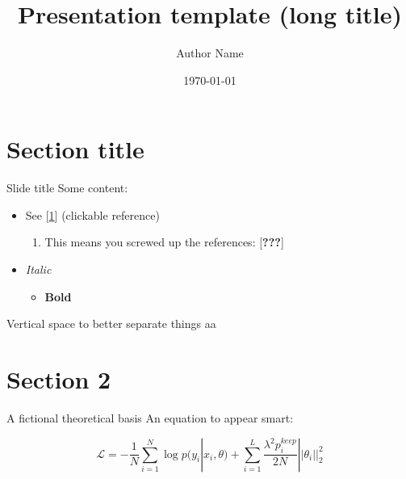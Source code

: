 \documentclass[ignorenonframetext,]{beamer}
\title[template (short title)]{Presentation template (long title)}
\author{Author Name}
\institute[INST1, INST2]{Institute 1 \and Institute 2 \newline on two lines}
\date{\today}
\providecommand{\tightlist}{%
  \setlength{\itemsep}{0pt}\setlength{\parskip}{0pt}}
\begin{document}
\frame{\titlepage}

\hypertarget{section-title}{%
\section{Section title}\label{section-title}}

\begin{frame}{Slide title}
\protect\hypertarget{slide-title}{}
Some content:

\begin{itemize}
\tightlist
\item
  See {[}\protect\hyperlink{ref-gptNIPS}{1}{]} (clickable reference)

  \begin{enumerate}
  \tightlist
  \item
    This means you screwed up the references: {[}{\textbf{???}}{]}
  \end{enumerate}
\item
  \emph{Italic}

  \begin{itemize}
  \tightlist
  \item
    \textbf{Bold}
  \end{itemize}
\end{itemize}

Vertical space to better separate things aa
\end{frame}

\hypertarget{section-2}{%
\section{Section 2}\label{section-2}}

\begin{frame}{A fictional theoretical basis}
\protect\hypertarget{a-fictional-theoretical-basis}{}
An equation to appear smart:

\begin{equation}
\mathcal{L}=-\frac 1 N \sum_{i=1}^N \log p(y_i|x_i,\theta)+\sum_{i=1}^L \frac{\lambda^2 p^{keep}_i}{2N}||\theta_i||_2^2
\label{eq1}
\end{equation}
\end{frame}
\end{document}
